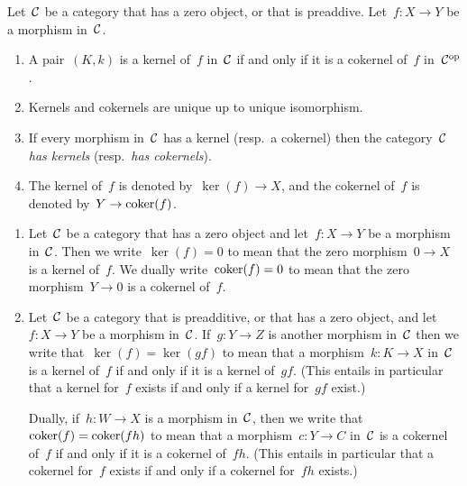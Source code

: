 \begin{remark}
  Let~$\mathcal{C}$ be a category that has a zero object, or that is preaddive.
  Let~$f \colon X \to Y$ be a morphism in~$\mathcal{C}$.
  \begin{enumerate}
    \item
      A pair~$(K,k)$ is a kernel of~$f$ in~$\mathcal{C}$ if and only if it is a cokernel of~$f$ in~$\mathcal{C}^{\mathrm{op}}$.
    \item
      Kernels and cokernels are unique up to unique isomorphism.
    \item
      If every morphism in~$\mathcal{C}$ has a kernel (resp.\ a cokernel) then the category~$\mathcal{C}$ \emph{has kernels} (resp.\ \emph{has cokernels}).
    \item
      The kernel of~$f$ is denoted by~$\ker(f) \to X$, and the cokernel of~$f$ is denoted by~$Y \to \operatorname{coker}(f)$.
  \end{enumerate}
\end{remark}










\begin{notation*}
  \leavevmode
  \begin{enumerate}
    \item
      Let~$\mathcal{C}$ be a category that has a zero object and let~$f \colon X \to Y$ be a morphism in~$\mathcal{C}$.
      Then we write~$\ker(f) = 0$ to mean that the zero morphism~$0 \to X$ is a kernel of~$f$.
      We dually write~$\operatorname{coker}(f) = 0$ to mean that the zero morphism~$Y \to 0$ is a cokernel of~$f$.
    \item
      Let~$\mathcal{C}$ be a category that is preadditive, or that has a zero object, and let~$f \colon X \to Y$ be a morphism in~$\mathcal{C}$.
      If~$g \colon Y \to Z$ is another morphism in~$\mathcal{C}$ then we write that~$\ker(f) = \ker(gf)$ to mean that a morphism~$k \colon K \to X$ in~$\mathcal{C}$ is a kernel of~$f$ if and only if it is a kernel of~$gf$.
      (This entails in particular that a kernel for~$f$ exists if and only if a kernel for~$gf$ exist.)
      
      Dually, if~$h \colon W \to X$ is a morphism in~$\mathcal{C}$, then we write that~$\operatorname{coker}(f) = \operatorname{coker}(fh)$ to mean that a morphism~$c \colon Y \to C$ in~$\mathcal{C}$ is a cokernel of~$f$ if and only if it is a cokernel of~$fh$.
      (This entails in particular that a cokernel for~$f$ exists if and only if a cokernel for~$fh$ exists.)
  \end{enumerate}
\end{notation*}


